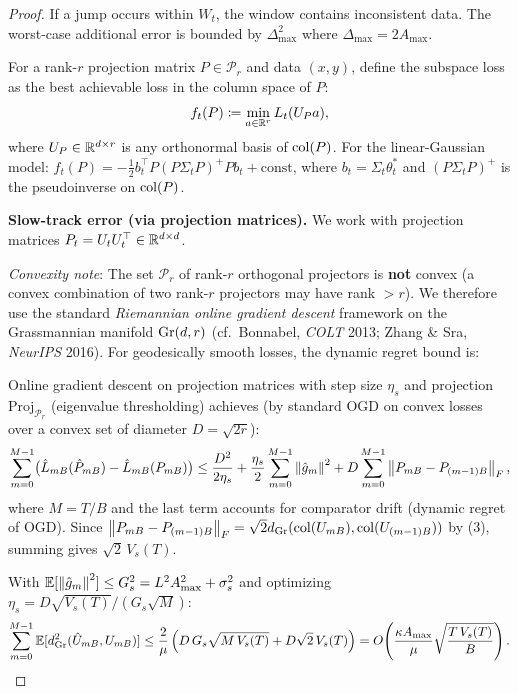 \begin{proof}
If a jump occurs within $W_t$, the window contains inconsistent data.
The worst-case additional error is bounded by $\Delta_{\max}^2$
where $\Delta_{\max} = 2A_{\max}$.

\begin{definition}
\label{def:subspace-loss}
For a rank-$r$ projection matrix $P \in \mathcal{P}_r$ and data
$(x, y)$, define the subspace loss as the best achievable loss
in the column space of $P$:
\[
  f_t(P) \coloneqq \min_{a \in \mathbb{R}^r} L_t(U_P a),
\]
where $U_P \in \mathbb{R}^{d \times r}$ is any orthonormal basis of $\mathrm{col}(P)$.
For the linear-Gaussian model:
$f_t(P) = -\frac{1}{2}b_t^\top P(P\Sigma_t P)^+ P b_t + \mathrm{const}$,
where $b_t = \Sigma_t\theta^*_t$ and $(P\Sigma_t P)^+$ is the
pseudoinverse on $\mathrm{col}(P)$.
\end{definition}

\textbf{Slow-track error (via projection matrices).}
We work with projection matrices $P_t = U_t U_t^\top \in \mathbb{R}^{d \times d}$.

\emph{Convexity note}: The set $\mathcal{P}_r$ of rank-$r$ orthogonal
projectors is \textbf{not} convex (a convex combination of two rank-$r$
projectors may have rank $> r$). We therefore use the standard
\emph{Riemannian online gradient descent} framework on the Grassmannian
manifold $\mathrm{Gr}(d,r)$ \textup{(cf.\ Bonnabel, \emph{COLT} 2013;
Zhang \& Sra, \emph{NeurIPS} 2016)}. For geodesically smooth
losses, the dynamic regret bound is:

Online gradient descent on projection matrices with step size
$\eta_s$ and projection $\mathrm{Proj}_{\mathcal{P}_r}$ (eigenvalue
thresholding) achieves (by standard OGD on convex losses over a convex set
of diameter $D = \sqrt{2r}$):
\[
  \sum_{m=0}^{M-1} \bigl(\hat{L}_{mB}(\hat{P}_{mB})
  - \hat{L}_{mB}(P_{mB})\bigr)
  \leq \frac{D^2}{2\eta_s} + \frac{\eta_s}{2}\sum_{m=0}^{M-1}
    \left\|\hat{g}_m\right\|^2 + D\sum_{m=0}^{M-1}\left\|P_{mB}-P_{(m-1)B}\right\|_F,
\]
where $M = T/B$ and the last term accounts for comparator drift
(dynamic regret of OGD). Since $\left\|P_{mB}-P_{(m-1)B}\right\|_F
= \sqrt{2}d_{\mathrm{Gr}}(\mathrm{col}(U_{mB}), \mathrm{col}(U_{(m-1)B}))$ by
(3), summing gives
$\sqrt{2}\,V_s(T)$.

With $\mathbb{E}[\left\|\hat{g}_m\right\|^2] \leq G_s^2 = L^2 A_{\max}^2 + \sigma_s^2$
and optimizing $\eta_s = D\sqrt{V_s(T)}/(G_s\sqrt{M})$:
\[
  \sum_{m=0}^{M-1} \mathbb{E}[d_{\mathrm{Gr}}^2(\hat{U}_{mB}, U_{mB})]
  \leq \frac{2}{\mu}\left(
    D\, G_s \sqrt{M\, V_s(T)} + D\sqrt{2}\,V_s(T)
  \right)
  = O\!\left(\frac{\kappa A_{\max}}{\mu}
    \sqrt{\frac{T\, V_s(T)}{B}}\right).
\]


\end{proof}
